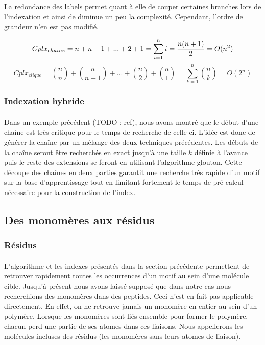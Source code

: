 \documentclass[12pt,french,twoside]{report}
\begin{document}
La redondance des labels permet quant à elle de couper certaines branches lors de l'indexation et ainsi de diminue un peu
la complexité. Cependant, l'ordre de grandeur n'en est pas modifié.

\begin{equation}
 Cplx_{chaine} = n + n-1 + ... + 2 + 1 = \sum_{i=1}^n i = {{n (n+1)} \over 2} = O(n^2)
\end{equation}
\begin{equation}
 Cplx_{clique} = {n \choose n} + {n \choose n-1} + ... + {n \choose 2} + {n \choose 1} = \sum_{k=1}^n {n \choose k} = O(2^n)
\end{equation}


\subsubsection{Indexation hybride}

\paragraph{}Dans un exemple précédent (TODO : ref), nous avons montré que le début d'une chaîne est très critique pour le temps
de recherche de celle-ci. L'idée est donc de générer la chaîne par un mélange des deux techniques précédentes. Les débuts de la 
chaîne seront être recherchés en exact jusqu'à une taille $k$ définie à l'avance puis le reste des extensions se feront en
utilisant l'algorithme glouton. Cette découpe des chaînes en deux parties garantit une recherche très rapide d'un
motif sur la base d'apprentissage tout en limitant fortement le temps de pré-calcul nécessaire pour la construction de l'index.



\subsection{Des monomères aux résidus}


\subsubsection{Résidus}

\paragraph{}L'algorithme et les indexes présentés dans la section précédente permettent de retrouver rapidement toutes les
occurrences d'un motif au sein d'une molécule cible. Jusqu'à présent nous avons laissé supposé que dans notre cas
nous recherchions des monomères dans des peptides. Ceci n'est en fait pas applicable directement. En effet, on ne retrouve jamais
un monomère en entier au sein d'un polymère. Lorsque les monomères sont liés ensemble pour former le polymère, chacun perd une
partie de ses atomes dans ces liaisons. Nous appellerons les molécules incluses des résidus (les monomères sans leurs atomes de
liaison).
\end{document}

